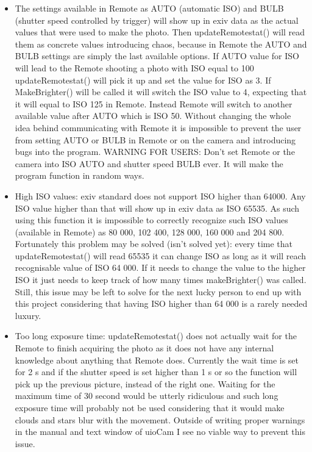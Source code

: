 \documentclass[]{book}
\begin{document}
		\begin{itemize}
			\item The settings available in Remote as AUTO (automatic ISO) and BULB (shutter speed controlled by trigger) will show up in exiv data as the actual values that were used to make the photo. Then updateRemotestat() will read them as concrete values introducing chaos, because in Remote the AUTO and BULB settings are simply the last available options. If AUTO value for ISO will lead to the Remote shooting a photo with ISO equal to 100 updateRemotestat() will pick it up and set the value for ISO as 3. If MakeBrighter() will be called it will switch the ISO value to 4, expecting that it will equal to ISO 125 in Remote. Instead Remote will switch to another available value after AUTO which is ISO 50. Without changing the whole idea behind communicating with Remote it is impossible to prevent the user from setting AUTO or BULB in Remote or on the camera and introducing bugs into the program.
			WARNING FOR USERS: Don't set Remote or the camera into ISO AUTO and shutter speed BULB ever. It will make the program function in random ways.
			\item High ISO values: exiv standard does not support ISO higher than 64000. Any ISO value higher than that will show up in exiv data as ISO 65535. As such using this function it is impossible to correctly recognize such ISO values (available in Remote) as 80 000, 102 400, 128 000, 160 000 and 204 800. Fortunately this problem may be solved (isn't solved yet): every time that updateRemotestat() will read 65535 it can change ISO as long as it will reach recognisable value of ISO 64 000. If it needs to change the value to the higher ISO it just needs to keep track of how many times makeBrighter() was called. Still, this issue may be left to solve for the next lucky person to end up with this project considering that having ISO higher than 64 000 is a rarely needed luxury.
			\item Too long exposure time: updateRemotestat() does not actually wait for the Remote to finish acquiring the photo as it does not have any internal knowledge about anything that Remote does. Currently the wait time is set for 2 s and if the shutter speed is set higher than 1 s or so the function will pick up the previous picture, instead of the right one. Waiting for the maximum time of 30 second would be utterly ridiculous and such long exposure time will probably not be used considering that it would make clouds and stars blur with the movement. Outside of writing proper warnings in the manual and text window of uioCam I see no viable way to prevent this issue.
		\end{itemize}
	
\end{document}
